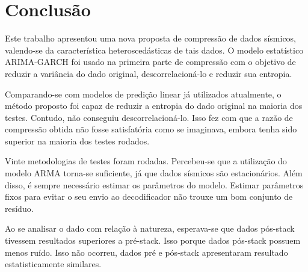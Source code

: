 \chapter{Conclusão} 
\label{Cap:conclusao}

Este trabalho apresentou uma nova proposta de compressão de dados sísmicos,
valendo-se da característica heteroscedásticas de tais dados. O modelo
estatístico ARIMA-GARCH foi usado na primeira parte de compressão com o objetivo
de reduzir a variância do dado original, descorrelacioná-lo e reduzir sua
entropia.

Comparando-se com modelos de predição linear já utilizados atualmente, o método
proposto foi capaz de reduzir a entropia do dado original na maioria dos testes.
Contudo, não conseguiu descorrelacioná-lo. Isso fez com que a razão de
compressão obtida não fosse satisfatória como se imaginava, embora tenha sido
superior na maioria dos testes rodados.

Vinte metodologias de testes foram rodadas. Percebeu-se que a utilização do
modelo ARMA torna-se suficiente, já que dados sísmicos são estacionários. Além
disso, é sempre necessário estimar os parâmetros do modelo. Estimar parâmetros
fixos para evitar o seu envio ao decodificador não trouxe um bom conjunto de
resíduo.

Ao se analisar o dado com relação à natureza, esperava-se que dados pós-stack
tivessem resultados superiores a pré-stack. Isso porque dados pós-stack possuem
menos ruído. Isso não ocorreu, dados pré e pós-stack apresentaram resultado
estatisticamente similares.
